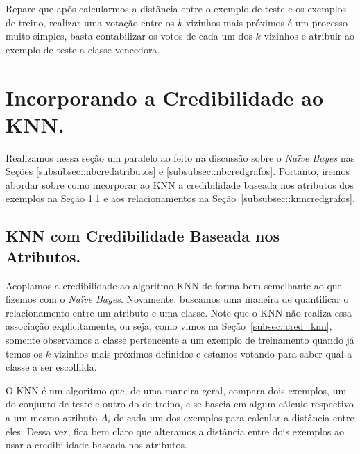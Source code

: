 Repare que após calcularmos a distância entre o exemplo de teste e os exemplos de treino, realizar uma votação entre os $k$ vizinhos mais próximos é um processo muito simples, basta contabilizar os votos de cada um dos $k$ vizinhos e atribuir ao exemplo de teste a classe vencedora.

\section{Incorporando a Credibilidade ao \textsc{KNN}.}
\label{subsubsec::knn_cred}

Realizamos nessa seção um paralelo ao feito na discussão sobre o \textit{Naïve Bayes} nas Seções \ref{subsubsec::nbcredatributos} e \ref{subsubsec::nbcredgrafos}. Portanto, iremos abordar sobre como incorporar ao \textsc{KNN} a credibilidade baseada nos atributos dos exemplos na Seção \ref{subsubsec::knncredatributos} e aos relacionamentos na Seção~\ref{subsubsec::knncredgrafos}.

\subsection{\textsc{KNN} com Credibilidade Baseada nos Atributos.}
\label{subsubsec::knncredatributos}


Acoplamos a credibilidade ao algoritmo \textsc{KNN} de forma bem semelhante ao que fizemos com o \textit{Naïve Bayes}. 
Novamente, buscamos uma maneira de quantificar o relacionamento entre um atributo e uma classe. 
Note que o \textsc{KNN} não realiza essa associação explicitamente, ou seja, como vimos na Seção~\ref{subsec::cred_knn}, somente observamos a classe pertencente a um exemplo de treinamento quando já temos os $k$ vizinhos mais próximos definidos e estamos votando para saber qual a classe a ser escolhida.

O \textsc{KNN} é um algoritmo que, de uma maneira geral, compara dois exemplos, um do conjunto de teste e outro do de treino, e se baseia em algum cálculo respectivo a um mesmo atributo $A_i$ de cada um dos exemplos para calcular a distância entre eles. Dessa vez, fica bem claro que alteramos a distância entre dois exemplos ao usar a credibilidade baseada nos atributos. 

